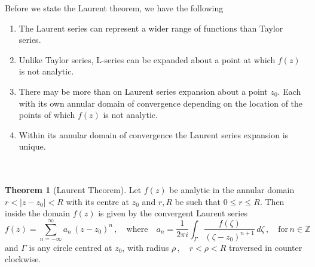 \documentclass[11pt,a4paper]{article}
\theoremstyle{definition}
\newtheorem{thm}{Theorem}[section]
\begin{document}
\pagebreak
Before we state the Laurent theorem, we have the following
\begin{enumerate}
\item The Laurent series can represent a wider range of functions  than Taylor series.
\item Unlike Taylor series, L-series can be expanded about a point at which $f(z)$ is not analytic.
\item There may be more than on Laurent series expansion about a point $z_0$. Each with its own annular domain of convergence depending on the location of the points of which $f(z)$ is not analytic.
\item Within its annular domain of convergence the Laurent series expansion is unique.\\\\\\
\end{enumerate}





\begin{thm}[Laurent Theorem]
Let $f(z)$ be analytic in the annular domain $r < \left|z - z_0\right| < R$ with its centre at $z_0$ and $r, R$ be such that $0\leq r\leq R$. Then inside the domain $f(z)$ is given by the convergent Laurent series $$f(z) = \sum^{\infty}_{n =-\infty} a_n \, (z - z_0)^n\,,\quad \text{where}\quad  a_n = \frac{1}{2\pi i}\int_{\Gamma}\frac{f(\zeta)}{(\zeta - z_0)^{n + 1}}\,d\zeta\,,\quad \text{for}\,n\in \mathbb{Z}$$
and $\Gamma$ is any circle centred at $z_0$, with radius $\rho\,,\quad  r< \rho < R$ traversed in counter clockwise.
\end{thm}
\end{document}
